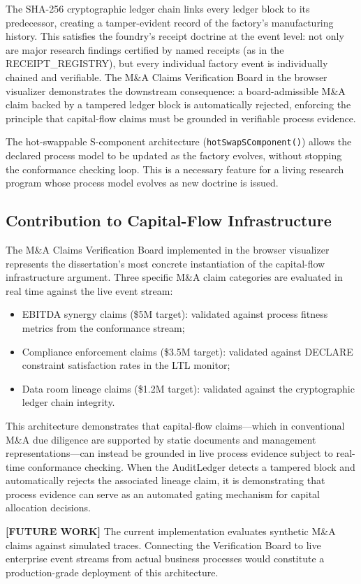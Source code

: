 The SHA-256 cryptographic ledger chain links every ledger block to its predecessor,
creating a tamper-evident record of the factory's manufacturing history. This
satisfies the foundry's receipt doctrine at the event level: not only are major
research findings certified by named receipts (as in the RECEIPT\_REGISTRY), but
every individual factory event is individually chained and verifiable. The M\&A
Claims Verification Board in the browser visualizer demonstrates the downstream
consequence: a board-admissible M\&A claim backed by a tampered ledger block is
automatically rejected, enforcing the principle that capital-flow claims must be
grounded in verifiable process evidence.

The hot-swappable S-component architecture (\texttt{hotSwapSComponent()}) allows
the declared process model to be updated as the factory evolves, without stopping
the conformance checking loop. This is a necessary feature for a living research
program whose process model evolves as new doctrine is issued.

\subsection{Contribution to Capital-Flow Infrastructure}
\label{sec:livestream-contribution-capital}

The M\&A Claims Verification Board implemented in the browser visualizer represents
the dissertation's most concrete instantiation of the capital-flow infrastructure
argument. Three specific M\&A claim categories are evaluated in real time against
the live event stream:
\begin{itemize}
  \item EBITDA synergy claims (\$5M target): validated against process fitness
    metrics from the conformance stream;
  \item Compliance enforcement claims (\$3.5M target): validated against DECLARE
    constraint satisfaction rates in the LTL monitor;
  \item Data room lineage claims (\$1.2M target): validated against the
    cryptographic ledger chain integrity.
\end{itemize}

This architecture demonstrates that capital-flow claims---which in conventional M\&A
due diligence are supported by static documents and management representations---can
instead be grounded in live process evidence subject to real-time conformance
checking. When the AuditLedger detects a tampered block and automatically rejects
the associated lineage claim, it is demonstrating that process evidence can serve
as an automated gating mechanism for capital allocation decisions.

\textbf{[FUTURE WORK]} The current implementation evaluates synthetic M\&A claims
against simulated traces. Connecting the Verification Board to live enterprise event
streams from actual business processes would constitute a production-grade deployment
of this architecture.

